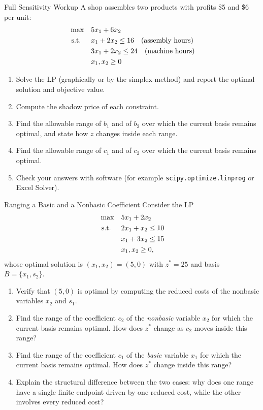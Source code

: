 \begin{ex}{Full Sensitivity Workup}{}
\label{ex:sensitivity-workup-2x2}
 A shop assembles two products with profits \$5 and \$6 per unit:
\[
\begin{aligned}
\max \quad & 5x_1 + 6x_2 \\
\mbox{ s.t. } \quad
& x_1 + 2x_2 \leq 16 \quad \mbox{(assembly hours)} \\
& 3x_1 + 2x_2 \leq 24 \quad \mbox{(machine hours)} \\
& x_1, x_2 \geq 0
\end{aligned}
\]
\begin{enumerate}
\item Solve the LP (graphically or by the simplex method) and report the optimal solution and objective value.
\item Compute the shadow price of each constraint.
\item Find the allowable range of $b_1$ and of $b_2$ over which the current basis remains optimal, and state how $z$ changes inside each range.
\item Find the allowable range of $c_1$ and of $c_2$ over which the current basis remains optimal.
\item Check your answers with software (for example \texttt{scipy.optimize.linprog} or Excel Solver).
\end{enumerate}
\exrefs{\S\ref{sec:sensitivity-rhs}, \S\ref{sec:sensitivity-cost}, \S\ref{sec:sensitivity-matrix}}
\end{ex}

\begin{ex}{Ranging a Basic and a Nonbasic Coefficient}{}
\label{ex:sensitivity-obj-nonbasic}
 Consider the LP
\[
\begin{aligned}
\max \quad & 5x_1 + 2x_2 \\
\mbox{ s.t. } \quad
& 2x_1 + x_2 \leq 10 \\
& x_1 + 3x_2 \leq 15 \\
& x_1, x_2 \geq 0,
\end{aligned}
\]
whose optimal solution is $(x_1, x_2) = (5, 0)$ with $z^* = 25$ and basis $B = \{x_1, s_2\}$.
\begin{enumerate}
\item Verify that $(5,0)$ is optimal by computing the reduced costs of the nonbasic variables $x_2$ and $s_1$.
\item Find the range of the coefficient $c_2$ of the \emph{nonbasic} variable $x_2$ for which the current basis remains optimal. How does $z^*$ change as $c_2$ moves inside this range?
\item Find the range of the coefficient $c_1$ of the \emph{basic} variable $x_1$ for which the current basis remains optimal. How does $z^*$ change inside this range?
\item Explain the structural difference between the two cases: why does one range have a single finite endpoint driven by one reduced cost, while the other involves every reduced cost?
\end{enumerate}
\exrefs{\S\ref{sec:sensitivity-cost}, \S\ref{sec:sensitivity-overview}}
\end{ex}

